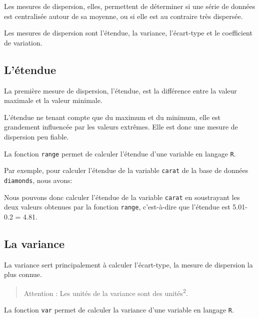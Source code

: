 \documentclass[]{book}
\newenvironment{Shaded}{\begin{snugshade}}{\end{snugshade}}
\newcommand{\KeywordTok}[1]{\textcolor[rgb]{0.13,0.29,0.53}{\textbf{#1}}}
\newcommand{\NormalTok}[1]{#1}
\newcommand{\OperatorTok}[1]{\textcolor[rgb]{0.81,0.36,0.00}{\textbf{#1}}}
\theoremstyle{definition}
\theoremstyle{definition}
\theoremstyle{definition}
\theoremstyle{remark}
\begin{document}
Les mesures de dispersion, elles, permettent de déterminer si une série
de données est centralisée autour de sa moyenne, ou si elle est au
contraire très dispersée.

Les mesures de dispersion sont l'étendue, la variance, l'écart-type et
le coefficient de variation.

\hypertarget{letendue}{%
\subsection{L'étendue}\label{letendue}}

La première mesure de dispersion, l'étendue, est la différence entre la
valeur maximale et la valeur minimale.

L'étendue ne tenant compte que du maximum et du minimum, elle est
grandement influencée par les valeurs extrêmes. Elle est donc une mesure
de dispersion peu fiable.

La fonction \texttt{range} permet de calculer l'étendue d'une variable
en langage \texttt{R}.

Par exemple, pour calculer l'étendue de la variable \texttt{carat} de la
base de données \texttt{diamonds}, nous avons:

\begin{Shaded}
\end{Shaded}

Nous pouvons donc calculer l'étendue de la variable \texttt{carat} en
soustrayant les deux valeurs obtenues par la fonction \texttt{range},
c'est-à-dire que l'étendue est 5.01-0.2 = 4.81.

\hypertarget{la-variance}{%
\subsection{La variance}\label{la-variance}}

La variance sert principalement à calculer l'écart-type, la mesure de
dispersion la plus connue.

\begin{quote}
Attention : Les unités de la variance sont des
unités\textsuperscript{2}.
\end{quote}

La fonction \texttt{var} permet de calculer la variance d'une variable
en langage \texttt{R}.
\end{document}
